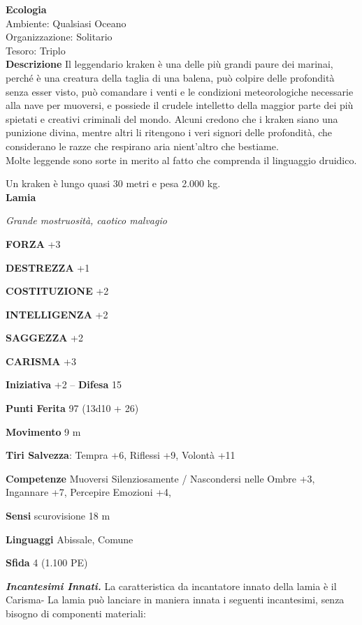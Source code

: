 \begin{multicols}{2}
\textbf{Ecologia}\\
Ambiente: Qualsiasi Oceano\\
Organizzazione: Solitario\\
Tesoro: Triplo\\

\textbf{Descrizione}
Il leggendario kraken è una delle più grandi paure dei marinai, perché è una creatura della taglia di una balena, può colpire delle profondità senza esser visto, può comandare i venti e le condizioni meteorologiche necessarie alla nave per muoversi, e possiede il crudele intelletto della maggior parte dei più spietati e creativi criminali del mondo. Alcuni credono che i kraken siano una punizione divina, mentre altri li ritengono i veri signori delle profondità, che considerano le razze che respirano aria nient'altro che bestiame.\\

Molte leggende sono sorte in merito al fatto che comprenda il linguaggio druidico.

Un kraken è lungo quasi 30 metri e pesa 2.000 kg.\\


\medskip{}\textbf{Lamia}

\emph{Grande mostruosità, caotico malvagio}

\textbf{FORZA} +3

\textbf{DESTREZZA} +1

\textbf{COSTITUZIONE} +2

\textbf{INTELLIGENZA} +2

\textbf{SAGGEZZA} +2

\textbf{CARISMA} +3

\textbf{Iniziativa} +2 -- \textbf{Difesa} 15

\textbf{Punti Ferita} 97 (13d10 + 26)

\textbf{Movimento} 9 m

\textbf{Tiri Salvezza}: Tempra +6, Riflessi +9, Volontà +11

\textbf{Competenze} Muoversi Silenziosamente / Nascondersi nelle Ombre +3, Ingannare +7, Percepire Emozioni +4,

\textbf{Sensi} scurovisione 18 m

\textbf{Linguaggi} Abissale, Comune

\textbf{Sfida} 4 (1.100 PE)

\emph{\textbf{Incantesimi Innati.}} La caratteristica da incantatore innato della lamia è il Carisma- La lamia può lanciare in maniera innata i seguenti incantesimi, senza bisogno di componenti materiali:


\end{multicols}
